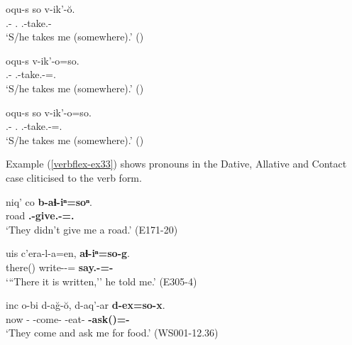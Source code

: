 \begin{exe}
	\ex\label{verbflex-ex32}
	\begin{xlist}
		
		
			\ex\label{verbflex-ex32a}
			\gll  oqu-s so v-ik'-\u{o}. \\
			{\Dist}.{\Obl}-{\Erg} {\Fsg}.{\Nom} {\M}.{\Sg}-take.{\Anim}-{\Npst} \\
			\trans `S/he takes me (somewhere).'
			\hfill (\cite[286]{kojima19})
		
		
		
			\ex\label{verbflex-ex32b}
			\gll oqu-s v-ik'-o=so. \\
			{\Dist}.{\Obl}-{\Erg} {\M}.{\Sg}-take.{\Anim}-{\Npst}={\Fsg}.{\Nom} \\
			\trans `S/he takes me (somewhere).'
			\hfill (\cite[286]{kojima19})
		
		
		
			\ex\label{verbflex-ex32c}
			\gll *oqu-s so v-ik’-o=so.  \\
			{\Dist}.{\Obl}-{\Erg} {\Fsg}.{\Nom} {\M}.{\Sg}-take.{\Anim}-{\Npst}={\Fsg}.{\Nom}\\
			\trans `S/he takes me (somewhere).'
			\hfill (\cite[287]{kojima19})
		
		
	\end{xlist}
\end{exe}


Example (\ref{verbflex-ex33}) shows pronouns in the Dative, Allative and Contact case cliticised to the verb form.

\begin{exe}
	\ex\label{verbflex-ex33}
	\begin{xlist}
		
		
			\ex\label{verbflex-ex33a}
			\gll niq' co \textbf{b-aɬ-iⁿ=soⁿ}. \\
			road {\Neg} \textbf{{\B}.{\Sg}-give.{\Pfv}-{\Aor}={\Fsg}.{\Dat}} \\
			\trans `They didn't give me a road.'
			\hfill (E171-20)
		
		
		
		
			\ex\label{verbflex-ex33b}
			\gll uis c'era-l-a=en, \textbf{aɬ-iⁿ=so-g}. \\
			there({\Lat}) write-{\Intr}-{\Npst}={\Quot} \textbf{say.{\Pfv}-{\Aor}={\Fsg}-{\All}} \\
			\trans `{``}There it is written,'' he told me.'
			\hfill (E305-4)
		
		
		
			\ex\label{verbflex-ex33c}
			\gll inc o-bi d-a\u{g}-\u{o}, d-aq'-ar \textbf{d-ex=so-x}. \\
			now {\Dist}-{\Pl} {\D}-come-{\Npst} {\D}-eat-{\Vn} \textbf{{\D}-ask({\Npst})={\Fsg}-{\Cont}} \\
			\trans `They come and ask me for food.'
			\hfill (WS001-12.36)
		
	\end{xlist}
\end{exe}

